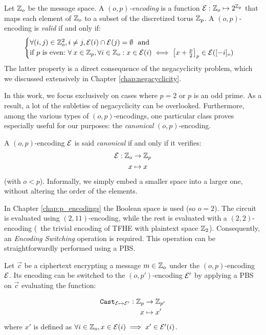 \begin{definition}[$(o, p)$-encoding]
	Let $\mathbb{Z}_o$ be the message space. A \emph{$(o, p)$-encoding} is a function $\mathcal{E}: \mathbb{Z}_o \mapsto 2^{\mathbb{Z}_p}$ that maps each element of $\mathbb{Z}_o$ to a subset of the discretized torus $\mathbb{Z}_p$. A $(o, p)$-encoding is \emph{valid} if and only if:
	\begin{equation}
		\begin{cases}
			\forall (i, j) \in \mathbb{Z}_o^2, i \ne j, \mathcal{E}(i) \cap \mathcal{E}(j) = \emptyset~\text{ and}\\
			\text{if $p$ is even:} ~\forall \:x \in \mathbb Z_p, \forall i \in \mathbb{Z}_o: x \in \mathcal{E}(i) \iff \left [ x + \frac p 2 \right ]_p \in \mathcal{E}([-i]_o)
		\end{cases}
		\label{def:validity}
	\end{equation}
	The latter property is a direct consequence of the negacyclicity problem, which we discussed extensively in Chapter \ref{chap:negacyclicity}.
	\label{def:encoding}
\end{definition}

In this work, we focus exclusively on cases where $p=2$ or $p$ is an odd prime. As a result, a lot of the subleties of negacyclicity can be overlooked. Furthermore, among the various types of $(o, p)$-encodings, one particular class proves especially useful for our purposes: the \textit{canonical} $(o, p)$-encoding.

\begin{definition}
	\label{def:canonical-encoding}
	A $(o, p)$-encoding $\mathcal{E}$ is said \textit{canonical} if and only if it verifies: 
	\begin{align*}
		\mathcal{E}: \mathbb{Z}_o &\rightarrow \mathbb{Z}_p\\
		x &\mapsto x
	\end{align*}
	(with $o < p$). Informally, we simply embed a smaller space into a larger one, without altering the order of the elements.
\end{definition}


In Chapter \ref{chap:p_encodings} the Boolean space is used (so $o=2$). The \SubBytes circuit is evaluated using $(2,11)$-encoding, while the rest is evaluated with a $(2, 2)$-encoding (\ie~the trivial encoding of TFHE with plaintext space $\mathbb{Z}_2$). Consequently, an \textit{Encoding Switching} operation is required. This operation can be straightforwardly performed using a PBS.

\begin{definition}
	\label{def:encoding-switching}
	Let $\vec c$ be a ciphertext encrypting a message $m \in \mathbb{Z}_o$ under the $(o, p)$-encoding $\mathcal{E}$. Its encoding can be switched to the $(o, p')$-encoding $\mathcal{E}'$ by applying a PBS on $\vec c$ evaluating the function:
	
	\begin{align*}
		\texttt{Cast}_{\mathcal{E} \mapsto \mathcal{E}'}: \mathbb{Z}_p &\rightarrow \mathbb{Z}_{p'}\\
		x &\mapsto x'
	\end{align*}
	where $x'$ is defined as $\forall i \in \mathbb{Z}_o, x \in \mathcal{E}(i) \implies x' \in \mathcal{E}'(i)$.
\end{definition}


